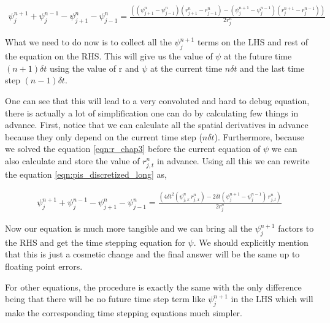 \begin{multline}
    \psi^{n+1}_{j} + \psi^{n-1}_{j} - \psi^{n}_{j+1} - \psi^{n}_{j-1} = \frac{((\psi^{n}_{j+1} - \psi^{n}_{j-1})(r^{n}_{j+1} - r^{n}_{j-1}) - (\psi^{n+1}_{j} - \psi^{n-1}_{j})(r^{n+1}_{j} - r^{n-1}_{j}))}{2 r^n_j}
    \label{eqn:pis_discretized_long}
\end{multline}

What we need to do now is to collect all the $\psi^{n+1}_j$ terms on the LHS and rest of the equation on the RHS. This will give us the value of $\psi$ at the future time $(n+1) \delta t$ using the value of r and $\psi$ at the current time $n \delta t$ and the last time step $ (n-1) \delta t$.


One can see that this will lead to a very convoluted and hard to debug equation, there is actually a lot of simplification one can do by calculating few things in advance. First, notice that we can calculate all the spatial derivatives in advance because they only depend on the current time step ($n \delta t$). Furthermore, because we solved the equation \ref{eqn:r_chap3} before the current equation of $\psi$ we can also calculate and store the value of $r^n_{j,t}$ in advance. Using all this we can rewrite the equation \ref{eqn:pis_discretized_long} as,


\begin{multline}
    \psi^{n+1}_{j} + \psi^{n-1}_{j} - \psi^{n}_{j+1} - \psi^{n}_{j-1} = \frac{(4\delta t^2 (\psi^{n}_{j,x} \, r^{n}_{j,x}) - 2 \delta t(\psi^{n+1}_{j} - \psi^{n-1}_{j})\,r^{n}_{j,t})}{2 r^n_j}
\end{multline}

Now our equation is much more tangible and we can bring all the $\psi^{n+1}_j$ factors to the RHS and get the time stepping equation for $\psi$. We should explicitly mention that this is just a cosmetic change and the final answer will be the same up to floating point errors.

For other equations, the procedure is exactly the same with the only difference being that there will be no future time step term like $\psi^{n+1}_j$ in the LHS which will make the corresponding time stepping equations much simpler.